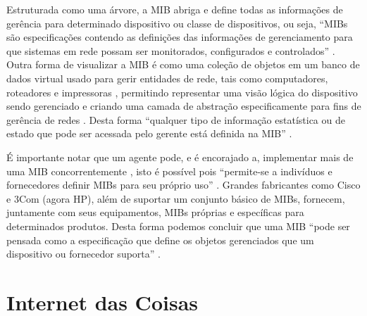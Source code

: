 \documentclass[twoside,english,brazilian]{UNISINOSmonografia}
\begin{document}
Estruturada como uma árvore, a MIB abriga e define todas as informações de 
gerência para determinado dispositivo ou classe de dispositivos, ou seja, 
``MIBs são especificações contendo as definições das informações de 
gerenciamento para que sistemas em rede possam ser monitorados, configurados e 
controlados''
\cite[p.~1]{perkins1997understanding}.
Outra forma de visualizar a MIB é como uma coleção de objetos em um banco de 
dados virtual usado para gerir entidades de rede, tais como computadores, 
roteadores e impressoras 
\cite{Ding2009}, permitindo representar uma visão lógica do dispositivo sendo 
gerenciado e criando uma camada de abstração especificamente para fins de 
gerência de redes 
\cite{Clemm2006}.
Desta forma 
``qualquer tipo de informação estatística ou de estado que pode ser acessada 
pelo gerente está definida na MIB''
\cite[p.~4]{Mauro2009}.

É importante notar que um agente pode, e é encorajado a, 
implementar mais de uma MIB concorrentemente 
\cite{Clemm2006}, 
isto é possível pois 
``permite-se a indivíduos e fornecedores definir MIBs para seu próprio uso'' 
\cite[p.~5]{Mauro2009}. 
Grandes fabricantes como Cisco e 3Com (agora HP), além de suportar um 
conjunto básico de MIBs, fornecem, juntamente com seus equipamentos, MIBs 
próprias e específicas para determinados produtos.
Desta forma podemos concluir que uma MIB 
``pode ser pensada como a especificação que define os objetos gerenciados que 
um dispositivo ou fornecedor suporta''
\cite[p.~27]{Mauro2009}.


\chapter{Internet das Coisas}
\end{document}
